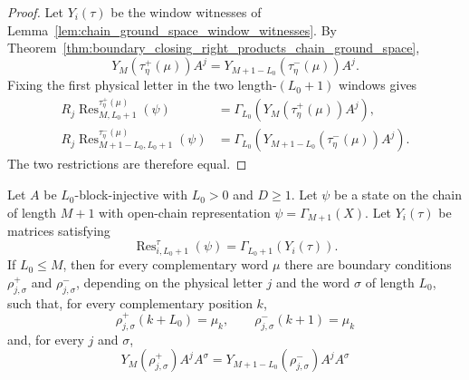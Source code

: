 \begin{proof}
    \notready
    Let $Y_i(\tau)$ be the window witnesses of
    Lemma~\ref{lem:chain_ground_space_window_witnesses}.  By
    Theorem~\ref{thm:boundary_closing_right_products_chain_ground_space},
    \[
        Y_M(\tau^+_\eta(\mu))A^j
        =
        Y_{M+1-L_0}(\tau^-_\eta(\mu))A^j .
    \]
    Fixing the first physical letter in the two length-$(L_0+1)$ windows gives
    \[
        \begin{aligned}
            R_j\operatorname{Res}^{\tau^+_\eta(\mu)}_{M,L_0+1}(\psi)
             & =
            \Gamma_{L_0}\!\left(Y_M(\tau^+_\eta(\mu))A^j\right), \\
            R_j\operatorname{Res}^{\tau^-_\eta(\mu)}_{M+1-L_0,L_0+1}(\psi)
             & =
            \Gamma_{L_0}\!\left(Y_{M+1-L_0}(\tau^-_\eta(\mu))A^j\right).
        \end{aligned}
    \]
    The two restrictions are therefore equal.
\end{proof}

\begin{theorem}
    \label{thm:closure_property_auxiliary_boundary_product_chain_ground_space}
    \leanok
    Let $A$ be $L_0$-block-injective with $L_0>0$ and $D\ge1$. Let $\psi$ be a
    state on the chain of length $M+1$ with open-chain representation
    $\psi=\Gamma_{M+1}(X)$.  Let $Y_i(\tau)$ be matrices satisfying
    \[
        \operatorname{Res}^{\tau}_{i,L_0+1}(\psi)
        =
        \Gamma_{L_0+1}(Y_i(\tau)).
    \]
    If $L_0\le M$, then for every complementary word $\mu$ there are boundary
    conditions $\rho^+_{j,\sigma}$ and $\rho^-_{j,\sigma}$, depending on the
    physical letter $j$ and the word $\sigma$ of length $L_0$, such that, for
    every complementary position $k$,
    \[
        \rho^+_{j,\sigma}(k+L_0)=\mu_k,
        \qquad
        \rho^-_{j,\sigma}(k+1)=\mu_k
    \]
    and, for every $j$ and $\sigma$,
    \[
        Y_M(\rho^+_{j,\sigma})A^jA^\sigma
        =
        Y_{M+1-L_0}(\rho^-_{j,\sigma})A^jA^\sigma
    \]
\end{theorem}


